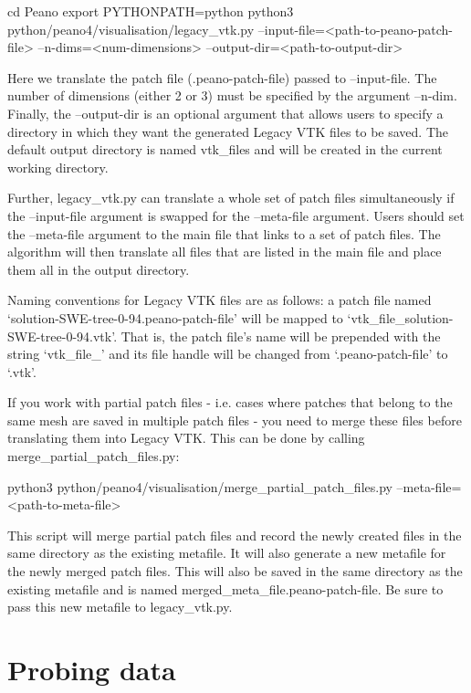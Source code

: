 \begin{code}
cd Peano
export PYTHONPATH=python
python3 python/peano4/visualisation/legacy_vtk.py --input-file=<path-to-peano-patch-file>
    --n-dims=<num-dimensions> --output-dir=<path-to-output-dir>
\end{code}

Here we translate the patch file (.peano-patch-file) passed to --input-file. The number of dimensions (either 2 or 3) must be specified by the argument --n-dim. Finally, the --output-dir is an optional argument that allows users to specify a directory in which they want the generated Legacy VTK files to be saved. The default output directory is named vtk\_files and will be created in the current working directory.

Further, legacy\_vtk.py can translate a whole set of patch files simultaneously if the --input-file argument is swapped for the --meta-file argument. Users should set the --meta-file argument to the main file that links to a set of patch files. The algorithm will then translate all files that are listed in the main file and place them all in the output directory.

Naming conventions for Legacy VTK files are as follows: a patch file named `solution-SWE-tree-0-94.peano-patch-file' will be mapped to `vtk\_file\_solution-SWE-tree-0-94.vtk'. That is, the patch file's name will be prepended with the string `vtk\_file\_' and its file handle will be changed from `.peano-patch-file' to `.vtk'.

\begin{remark}
 If you work with partial patch files - i.e. cases where patches that
 belong to the same mesh are saved in multiple patch files - you need to
 merge these files before translating them into Legacy VTK. This can be done
 by calling merge\_partial\_patch\_files.py:
    \begin{code}
        python3 python/peano4/visualisation/merge_partial_patch_files.py
            --meta-file=<path-to-meta-file>
    \end{code}
 This script will merge partial patch files and record the newly created files
 in the same directory as the existing metafile. It will also generate a new metafile
 for the newly merged patch files. This will also be saved in the same directory as the 
 existing metafile and is named merged\_meta\_file.peano-patch-file. Be 
 sure to pass this new metafile to legacy\_vtk.py.
\end{remark}

\section{Probing data}
\label{section:postprocessing:probing}

